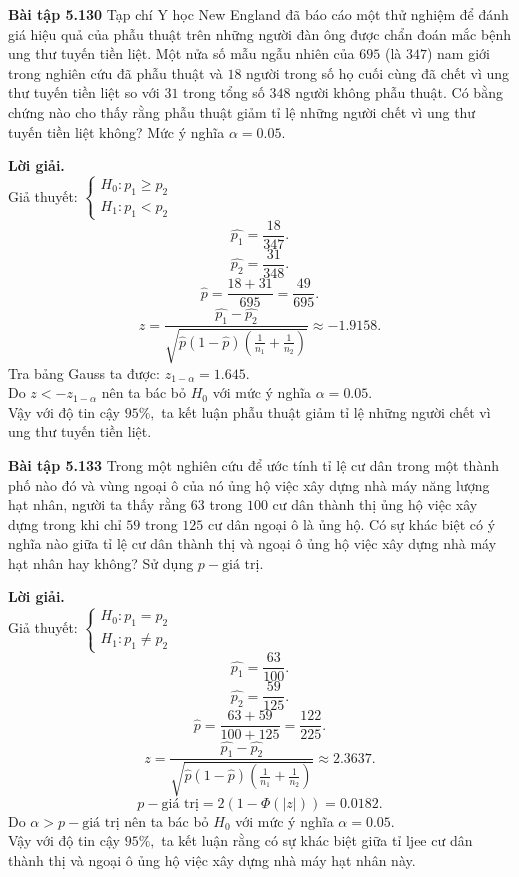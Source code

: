\begin{mybox}
\textbf{Bài tập 5.130} Tạp chí Y học New England đã báo cáo một thử nghiệm để đánh giá hiệu quả của phẫu thuật trên những người đàn ông được chẩn đoán mắc bệnh ung thư tuyến tiền liệt. Một nửa số mẫu ngẫu nhiên của $695$ (là $347$) nam giới trong nghiên cứu đã phẫu thuật và $18$ người trong số họ cuối cùng đã chết vì ung thư tuyến tiền liệt so với $31$ trong tổng số $348$ người không phẫu thuật. Có bằng chứng nào cho thấy rằng phẫu thuật giảm tỉ lệ những người chết vì ung thư tuyến tiền liệt không? Mức ý nghĩa $\alpha = 0.05.$
\end{mybox}
\textbf{Lời giải.}\\
Giả thuyết: $\begin{cases}
H_0: p_1 \geqslant p_2\\
H_1: p_1 < p_2
\end{cases}$\\
$$\widehat{p_1} = \frac{18}{347}.$$
$$\widehat{p_2} = \frac{31}{348}.$$
$$\widehat{p} = \frac{18 + 31}{695} = \frac{49}{695}.$$
$$z = \frac{{\widehat {{p_1}} - \widehat {{p_2}}}}{{\sqrt {\widehat p\left( {1 - \widehat p} \right)\left( {\frac{1}{{{n_1}}} + \frac{1}{{{n_2}}}} \right)} }} \approx -1.9158.$$
Tra bảng Gauss ta được: $z_{1 - \alpha} = 1.645.$\\
Do $z < - z_{1 - \alpha}$ nên ta bác bỏ $H_0$ với mức ý nghĩa $\alpha = 0.05.$\\
Vậy với độ tin cậy $95\%,$ ta kết luận phẫu thuật giảm tỉ lệ những người chết vì ung thư tuyến tiền liệt.

\begin{mybox}
\textbf{Bài tập 5.133} Trong một nghiên cứu để ước tính tỉ lệ cư dân trong một thành phố nào đó và vùng ngoại ô của nó ủng hộ việc xây dựng nhà máy năng lượng hạt nhân, người ta thấy rằng $63$ trong $100$ cư dân thành thị ủng hộ việc xây dựng trong khi chỉ $59$ trong $125$ cư dân ngoại ô là ủng hộ. Có sự khác biệt có ý nghĩa nào giữa tỉ lệ cư dân thành thị và ngoại ô ủng hộ việc xây dựng nhà máy hạt nhân hay không? Sử dụng $p-\text{giá trị}.$
\end{mybox}
\textbf{Lời giải.}\\
Giả thuyết: $\begin{cases}
H_0: p_1 = p_2\\
H_1: p_1 \ne p_2
\end{cases}$\\
$$\widehat{p_1} = \frac{63}{100}.$$
$$\widehat{p_2} = \frac{59}{125}.$$
$$\widehat{p} = \frac{63 + 59}{100 + 125} = \frac{122}{225}.$$
$$z = \frac{{\widehat {{p_1}} - \widehat {{p_2}}}}{{\sqrt {\widehat p\left( {1 - \widehat p} \right)\left( {\frac{1}{{{n_1}}} + \frac{1}{{{n_2}}}} \right)} }} \approx 2.3637.$$
$$p-\text{giá trị} = 2 \left( {1 - \Phi \left( {\left| z \right|} \right)} \right) = 0.0182.$$
Do $\alpha > p-\text{giá trị}$ nên ta bác bỏ $H_0$ với mức ý nghĩa $\alpha = 0.05.$\\
Vậy với độ tin cậy $95\%,$ ta kết luận rằng có sự khác biệt giữa tỉ ljee cư dân thành thị và ngoại ô ủng hộ việc xây dựng nhà máy hạt nhân này.

